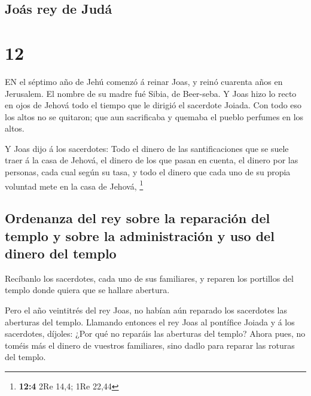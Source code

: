 \hypertarget{jouxe1s-rey-de-juduxe1}{%
\subsection{Joás rey de Judá}\label{jouxe1s-rey-de-juduxe1}}

\hypertarget{section-11}{%
\section{12}\label{section-11}}

 EN el séptimo año de Jehú comenzó á reinar Joas, y reinó
cuarenta años en Jerusalem. El nombre de su madre fué Sibia, de
Beer-seba.  Y Joas hizo lo recto en ojos de Jehová todo el
tiempo que le dirigió el sacerdote Joiada.  Con todo eso los
altos no se quitaron; que aun sacrificaba y quemaba el pueblo perfumes
en los altos.

 Y Joas dijo á los sacerdotes: Todo el dinero de las
santificaciones que se suele traer á la casa de Jehová, el dinero de los
que pasan en cuenta, el dinero por las personas, cada cual según su
tasa, y todo el dinero que cada uno de su propia voluntad mete en la
casa de Jehová, \footnote{\textbf{12:4} 2Re 14,4; 1Re 22,44}

\hypertarget{ordenanza-del-rey-sobre-la-reparaciuxf3n-del-templo-y-sobre-la-administraciuxf3n-y-uso-del-dinero-del-templo}{%
\subsection{Ordenanza del rey sobre la reparación del templo y sobre la
administración y uso del dinero del
templo}\label{ordenanza-del-rey-sobre-la-reparaciuxf3n-del-templo-y-sobre-la-administraciuxf3n-y-uso-del-dinero-del-templo}}

 Recíbanlo los sacerdotes, cada uno de sus familiares, y
reparen los portillos del templo donde quiera que se hallare abertura.

 Pero el año veintitrés del rey Joas, no habían aún reparado
los sacerdotes las aberturas del templo.  Llamando entonces
el rey Joas al pontífice Joiada y á los sacerdotes, díjoles: ¿Por qué no
reparáis las aberturas del templo? Ahora pues, no toméis más el dinero
de vuestros familiares, sino dadlo para reparar las roturas del templo.

